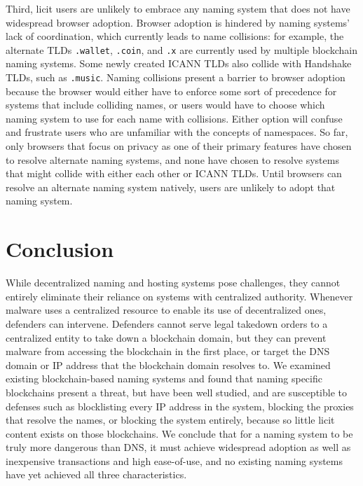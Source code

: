 \documentclass[conference]{IEEEtran}
\begin{document}
Third, licit users are unlikely to embrace any naming system that does not have widespread browser 
adoption. Browser adoption is hindered by naming systems' lack of coordination, which currently leads 
to name collisions: for example, the alternate TLDs \texttt{.wallet}, \texttt{.coin}, and \texttt{.x} 
are currently used by multiple blockchain naming systems. Some newly created ICANN TLDs also collide 
with Handshake TLDs, such as \texttt{.music}. Naming collisions present a barrier to browser adoption 
because the browser would either have to enforce some sort of precedence for systems that include 
colliding names, or users would have to choose which naming system to use for each name with 
collisions. Either option will confuse and frustrate users who are unfamiliar with the concepts of 
namespaces. So far, only browsers that focus on privacy as one of their primary features have chosen 
to resolve alternate naming systems, and none have chosen to resolve systems that might collide with 
either each other or ICANN TLDs. Until browsers can resolve an alternate naming system natively, users 
are unlikely to adopt that naming system.


\section{Conclusion}

While decentralized naming and hosting systems pose challenges, they cannot 
entirely 
eliminate their reliance on systems with centralized authority. Whenever 
malware uses a centralized 
resource to enable its use of decentralized ones, defenders can intervene. 
Defenders cannot serve 
legal takedown orders to a centralized entity to take 
down a blockchain domain, but they can prevent malware from accessing the 
blockchain in the first 
place, or target the DNS domain or IP address that the blockchain domain 
resolves to. We examined existing blockchain-based naming systems and found that naming specific 
blockchains present a threat, but have been well studied, and are susceptible to defenses such as 
blocklisting every IP address in the system, blocking the proxies that resolve the names, or blocking 
the system entirely, because so little licit 
content exists on those blockchains. We conclude that for a naming system to be truly more dangerous 
than DNS, it must achieve widespread adoption as well as inexpensive transactions and high 
ease-of-use, and no existing naming systems have yet achieved all three characteristics. 
\end{document}

